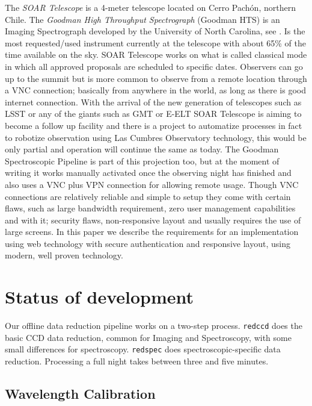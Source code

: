 \documentclass[11pt,twoside]{article}
\begin{document}
The \emph{SOAR Telescope} is a 4-meter telescope located on Cerro Pach\'on, northern Chile. The \emph{Goodman High Throughput Spectrograph} (Goodman HTS) is an Imaging Spectrograph developed by the University of North Carolina, see \citet{2004SPIE.5492..331C}. Is the most requested/used instrument currently at the telescope with about 65\% of the time available on the sky. SOAR Telescope works on what is called classical mode in which all approved proposals are scheduled to specific dates. Observers can go up to the summit but is more common to observe from a remote location through a VNC connection; basically from anywhere in the world, as long as there is good internet connection. With the arrival of the new generation of telescopes such as LSST or any of the giants such as GMT or E-ELT SOAR Telescope is aiming to become a follow up facility and there is a project to automatize processes in fact to robotize observation using Las Cumbres Observatory technology, this would be only partial and operation will continue the same as today. The Goodman Spectroscopic Pipeline is part of this projection too, but at the moment of writing it works manually activated once the observing night has finished and also uses a VNC plus VPN connection for allowing remote usage. Though VNC connections are relatively reliable and simple to setup they come with certain flaws, such as large bandwidth requirement, zero user management capabilities and with it; security flaws, non-responsive layout and usually requires the use of large screens. In this paper we describe the requirements for an implementation using web technology with secure authentication and responsive layout, using modern, well proven technology.

\section{Status of development}


Our offline data reduction pipeline works on a two-step process. \verb=redccd= does the basic CCD data reduction, common for Imaging and Spectroscopy, with some small differences for spectroscopy. \verb=redspec= does spectroscopic-specific data reduction. Processing a full night takes between three and five minutes.

\subsection{Wavelength Calibration}
\end{document}
